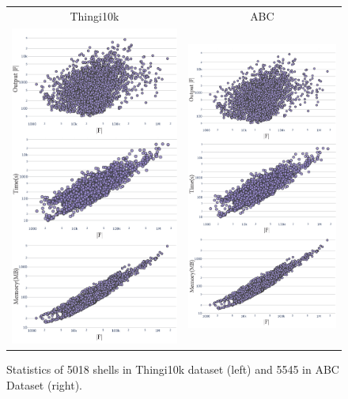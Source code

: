 %     
\begin{figure}
    \centering
    \begin{tabular}{cc}
        Thingi10k & ABC \\ 
        \includegraphics[width=0.4\linewidth,page=2]{prism-tex/figs/stats_combined}
        &\includegraphics[width=0.4\linewidth,page=1]{prism-tex/figs/stats_combined}
    \end{tabular}
    \caption{Statistics of 5018 shells in Thingi10k dataset \cite{zhou2016thingi10k} (left) and 5545 in ABC Dataset \cite{Koch_2019_CVPR} (right).}
    \label{prism:fig:large-dataset}
    
\end{figure}


